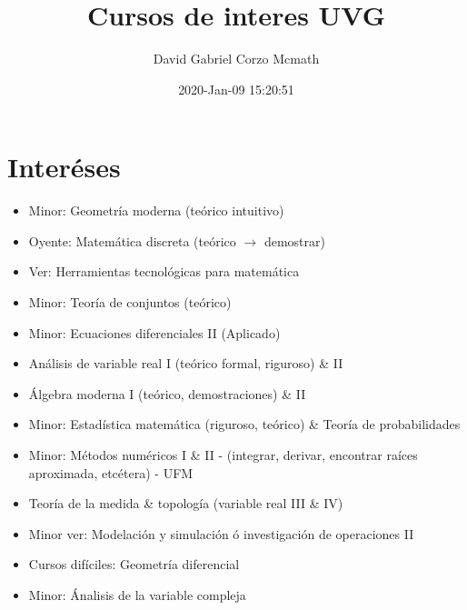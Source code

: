 \documentclass{article}
\title{Cursos de interes UVG}
\author{David Gabriel Corzo Mcmath}
\date{2020-Jan-09 15:20:51}
\begin{document}
\maketitle

\section{Interéses}
\begin{itemize}
    \item Minor: Geometría moderna (teórico intuitivo)
    \item Oyente: Matemática discreta (teórico $\rightarrow$ demostrar)
    \item Ver: Herramientas tecnológicas para matemática
    \item Minor: Teoría de conjuntos (teórico)
    \item Minor: Ecuaciones diferenciales II (Aplicado)
    \item Análisis de variable real I (teórico formal, riguroso) \& II 
    \item Álgebra moderna I (teórico, demostraciones) \& II
    \item Minor: Estadística matemática (riguroso, teórico) \& Teoría de probabilidades
    \item Minor: Métodos numéricos I \& II - (integrar, derivar, encontrar raíces aproximada, etcétera) - UFM 
    \item Teoría de la medida \& topología (variable real III \& IV) 
    \item Minor ver: Modelación y simulación ó investigación de operaciones II
    \item Cursos difíciles: Geometría diferencial 
    \item Minor: Ánalisis de la variable compleja 
\end{itemize}
\end{document}
